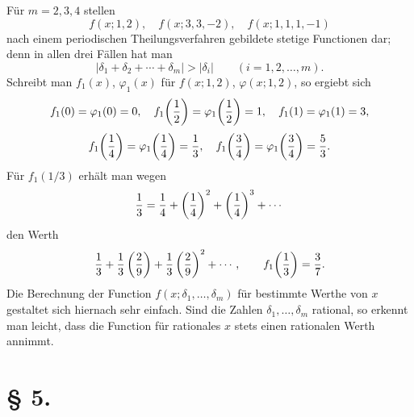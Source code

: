 Für $m=2,3,4$ stellen
\[
 f(x;1,2),\quad f(x;3,3,-2),\quad f(x;1,1,1,-1)
\]
nach einem periodischen Theilungsverfahren gebildete stetige Functionen dar; denn in allen drei Fällen hat man
\[
 |\delta_1+\delta_2+\cdots+\delta_m|>|\delta_i|
 \qquad (i=1,2,\ldots,m).
\]
Schreibt man $f_1(x)$, $\varphi_1(x)$ für $f(x;1,2)$, $\varphi(x;1,2)$, so ergiebt sich
\[
 f_1(0)=\varphi_1(0)=0,
 \quad
 f_1\!\left({1\over2}\right)=\varphi_1\!\left({1\over2}\right)=1,
 \quad
 f_1(1)=\varphi_1(1)=3,
\]
\[
 f_1\!\left({1\over4}\right)=\varphi_1\!\left({1\over4}\right)={1\over3},
 \quad
 f_1\!\left({3\over4}\right)=\varphi_1\!\left({3\over4}\right)={5\over3}.
\]
Für $f_1(1/3)$ erhält man wegen
\[
 {1\over3}={1\over4}+\left({1\over4}\right)^2+\left({1\over4}\right)^3+\cdots
\]
den Werth
\[
 {1\over3}+{1\over3}\left({2\over9}\right)+{1\over3}\left({2\over9}\right)^2+\cdots,
 \qquad
 f_1\!\left({1\over3}\right)={3\over7}.
\]
Die Berechnung der Function $f(x;\delta_1,\ldots,\delta_m)$ für bestimmte Werthe von $x$ gestaltet sich hiernach sehr einfach. Sind die Zahlen $\delta_1,\ldots,\delta_m$ rational, so erkennt man leicht, dass die Function für rationales $x$ stets einen rationalen Werth annimmt.

\section*{§ 5.}


